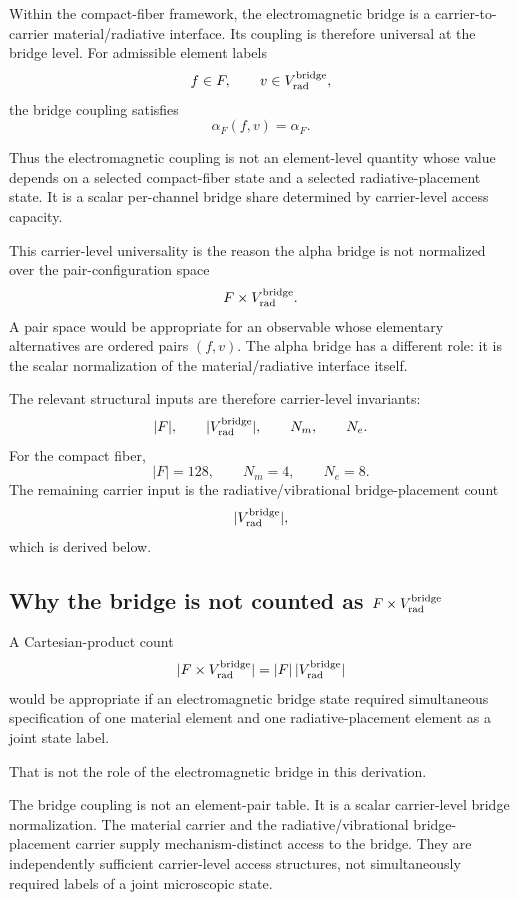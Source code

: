 Within the compact-fiber framework, the electromagnetic bridge is a carrier-to-carrier material/radiative interface. Its coupling is therefore universal at the bridge level. For admissible element labels
\[
f\in F,
\qquad
v\in V_{\rm rad}^{\rm bridge},
\]
the bridge coupling satisfies
\[
\alpha_F(f,v)=\alpha_F.
\]

Thus the electromagnetic coupling is not an element-level quantity whose value depends on a selected compact-fiber state and a selected radiative-placement state. It is a scalar per-channel bridge share determined by carrier-level access capacity.

This carrier-level universality is the reason the alpha bridge is not normalized over the pair-configuration space
\[
F\times V_{\rm rad}^{\rm bridge}.
\]
A pair space would be appropriate for an observable whose elementary alternatives are ordered pairs \((f,v)\). The alpha bridge has a different role: it is the scalar normalization of the material/radiative interface itself.

The relevant structural inputs are therefore carrier-level invariants:
\[
|F|,
\qquad
|V_{\rm rad}^{\rm bridge}|,
\qquad
N_m,
\qquad
N_e.
\]
For the compact fiber,
\[
|F|=128,
\qquad
N_m=4,
\qquad
N_e=8.
\]
The remaining carrier input is the radiative/vibrational bridge-placement count
\[
|V_{\rm rad}^{\rm bridge}|,
\]
which is derived below.

\subsection{\texorpdfstring{Why the bridge is not counted as \(F\times V_{\rm rad}^{\rm bridge}\)}{Why the bridge is not counted as F x Vrad bridge}}

A Cartesian-product count
\[
|F\times V_{\rm rad}^{\rm bridge}|
=
|F|\,|V_{\rm rad}^{\rm bridge}|
\]
would be appropriate if an electromagnetic bridge state required simultaneous specification of one material element and one radiative-placement element as a joint state label.

That is not the role of the electromagnetic bridge in this derivation.

The bridge coupling is not an element-pair table. It is a scalar carrier-level bridge normalization. The material carrier and the radiative/vibrational bridge-placement carrier supply mechanism-distinct access to the bridge. They are independently sufficient carrier-level access structures, not simultaneously required labels of a joint microscopic state.

